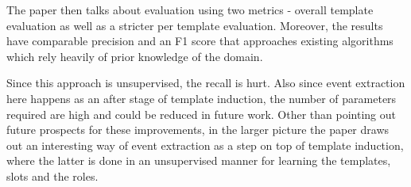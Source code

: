 The paper then talks about evaluation using two metrics - overall template evaluation as well as a stricter per template evaluation. Moreover, the results have comparable precision and an F1 score that approaches existing algorithms which rely heavily of prior knowledge of the domain.

Since this approach is unsupervised, the recall is hurt. Also since event extraction here happens as an after stage of template induction, the number of parameters required are high and could be reduced in future work. Other than pointing out future prospects for these improvements, in the larger picture the paper draws out an interesting way of event extraction as a step on top of template induction, where the latter is done in an unsupervised manner for learning the templates, slots and the roles.\\

